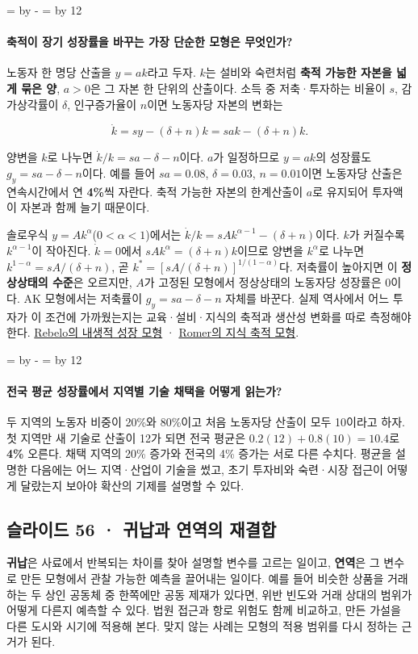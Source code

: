 \documentclass[10pt,a4paper]{article}
\newcommand{\ReserveQuestionSpace}{%
  \par\begingroup
  \dimen0=\pagegoal \advance\dimen0 by -\pagetotal
  \dimen2=\baselineskip \multiply\dimen2 by 12
  \ifdim\dimen0<\dimen2 \newpage\fi
  \endgroup}
\begin{document}
\ReserveQuestionSpace
\paragraph{축적이 장기 성장률을 바꾸는 가장 단순한 모형은 무엇인가?}
노동자 한 명당 산출을 $y=ak$라고 두자. $k$는 설비와 숙련처럼 \textbf{축적 가능한 자본을 넓게 묶은 양}, $a>0$은 그 자본 한 단위의 산출이다. 소득 중 저축·투자하는 비율이 $s$, 감가상각률이 $\delta$, 인구증가율이 $n$이면 노동자당 자본의 변화는\par

\[
\dot k=sy-(\delta+n)k=sak-(\delta+n)k.
\]

양변을 $k$로 나누면 $\dot k/k=sa-\delta-n$이다. $a$가 일정하므로 $y=ak$의 성장률도 $g_y=sa-\delta-n$이다. 예를 들어 $sa=0.08$, $\delta=0.03$, $n=0.01$이면 노동자당 산출은 연속시간에서 연 \textbf{4\%}씩 자란다. 축적 가능한 자본의 한계산출이 $a$로 유지되어 투자액이 자본과 함께 늘기 때문이다.\par

솔로우식 $y=Ak^\alpha$($0<\alpha<1$)에서는 $\dot k/k=sAk^{\alpha-1}-(\delta+n)$이다. $k$가 커질수록 $k^{\alpha-1}$이 작아진다. $\dot k=0$에서 $sAk^\alpha=(\delta+n)k$이므로 양변을 $k^\alpha$로 나누면 $k^{1-\alpha}=sA/(\delta+n)$, 곧 $k^*=[sA/(\delta+n)]^{1/(1-\alpha)}$다. 저축률이 높아지면 이 \textbf{정상상태의 수준}은 오르지만, $A$가 고정된 모형에서 정상상태의 노동자당 성장률은 0이다. AK 모형에서는 저축률이 $g_y=sa-\delta-n$ 자체를 바꾼다. 실제 역사에서 어느 투자가 이 조건에 가까웠는지는 교육·설비·지식의 축적과 생산성 변화를 따로 측정해야 한다. \href{https://www.journals.uchicago.edu/doi/10.1086/261764}{Rebelo의 내생적 성장 모형} · \href{https://www.journals.uchicago.edu/doi/10.1086/261420}{Romer의 지식 축적 모형}.\par

\ReserveQuestionSpace
\paragraph{전국 평균 성장률에서 지역별 기술 채택을 어떻게 읽는가?}
두 지역의 노동자 비중이 20\%와 80\%이고 처음 노동자당 산출이 모두 10이라고 하자. 첫 지역만 새 기술로 산출이 12가 되면 전국 평균은 $0.2(12)+0.8(10)=10.4$로 \textbf{4\%} 오른다. 채택 지역의 20\% 증가와 전국의 4\% 증가는 서로 다른 수치다. 평균을 설명한 다음에는 어느 지역·산업이 기술을 썼고, 초기 투자비와 숙련·시장 접근이 어떻게 달랐는지 보아야 확산의 기제를 설명할 수 있다.\par

\subsection{슬라이드 56 · 귀납과 연역의 재결합}
\textbf{귀납}은 사료에서 반복되는 차이를 찾아 설명할 변수를 고르는 일이고, \textbf{연역}은 그 변수로 만든 모형에서 관찰 가능한 예측을 끌어내는 일이다. 예를 들어 비슷한 상품을 거래하는 두 상인 공동체 중 한쪽에만 공동 제재가 있다면, 위반 빈도와 거래 상대의 범위가 어떻게 다른지 예측할 수 있다. 법원 접근과 항로 위험도 함께 비교하고, 만든 가설을 다른 도시와 시기에 적용해 본다. 맞지 않는 사례는 모형의 적용 범위를 다시 정하는 근거가 된다.\par
\end{document}
